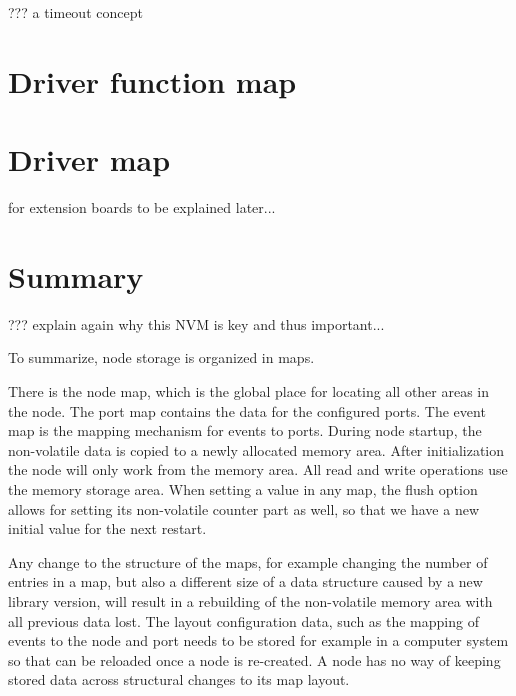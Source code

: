 ??? a timeout concept

\section{Driver function map}

\section{Driver map}

for extension boards to be explained later...

\section{Summary}

??? explain again why this NVM is key and thus important...

To summarize, node storage is organized in maps. 

There is the node map, which is the global place for locating all other areas in the node. The port map contains the data for the configured ports. The event map is the mapping mechanism for events to ports. During node startup, the non-volatile data is copied to a newly allocated memory area. After initialization the node will only work from the memory area. All read and write operations use the memory storage area. When setting a value in any map, the flush option allows for setting its non-volatile counter part as well, so that we have a new initial value for the next restart.

Any change to the structure of the maps, for example changing the number of entries in a map, but also a different size of a data structure caused by a new library version, will result in a rebuilding of the non-volatile memory area with all previous data lost. The layout configuration data, such as the mapping of events to the node and port needs to be stored for example in a computer system so that can be reloaded once a node is re-created. A node has no way of keeping stored data across structural changes to its map layout.
